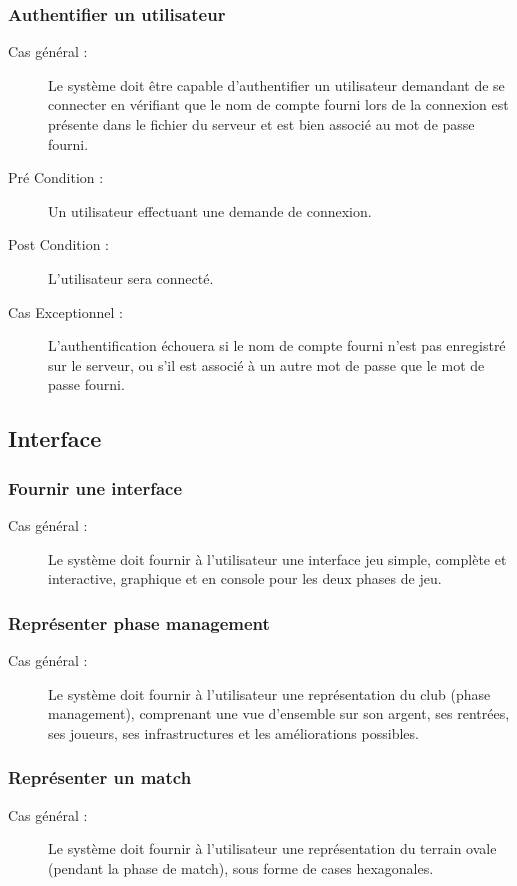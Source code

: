 \documentclass[a4paper]{report}
\begin{document}
\subsubsection{Authentifier un utilisateur}
\begin{description}
    \item[Cas général :] Le système doit être capable d'authentifier un \gls{utilisateur} demandant de se connecter en vérifiant que le nom de compte fourni lors de la connexion est présente dans le fichier du \gls{serveur} et est bien associé au mot de passe fourni.
    \item[Pré Condition  :] Un \gls{utilisateur} effectuant une demande de connexion.
    \item[Post Condition :] L'\gls{utilisateur} sera connecté.
    \item[Cas Exceptionnel :] L'authentification échouera si le nom de compte fourni n'est pas enregistré sur le \gls{serveur}, ou s'il est associé à un autre mot de passe que le mot de passe fourni.
\end{description}

\subsection{Interface}
\subsubsection{Fournir une interface}
\begin{description}
    \item[Cas général :] Le système doit fournir à l'\gls{utilisateur} une interface jeu simple, complète et interactive, graphique et en console pour les deux phases de jeu.
\end{description}

\subsubsection{Représenter phase management}
\begin{description}
    \item[Cas général :] Le système doit fournir à l'\gls{utilisateur} une représentation du \gls{club} (phase management), comprenant une vue d'ensemble sur son argent, ses rentrées, ses \glspl{joueur}, ses infrastructures et les améliorations possibles.
\end{description}

\subsubsection{Représenter un match}
\begin{description}
    \item[Cas général :] Le système doit fournir à l'\gls{utilisateur} une représentation du terrain ovale (pendant la phase de match), sous forme de cases hexagonales.
\end{description}
\end{document}
